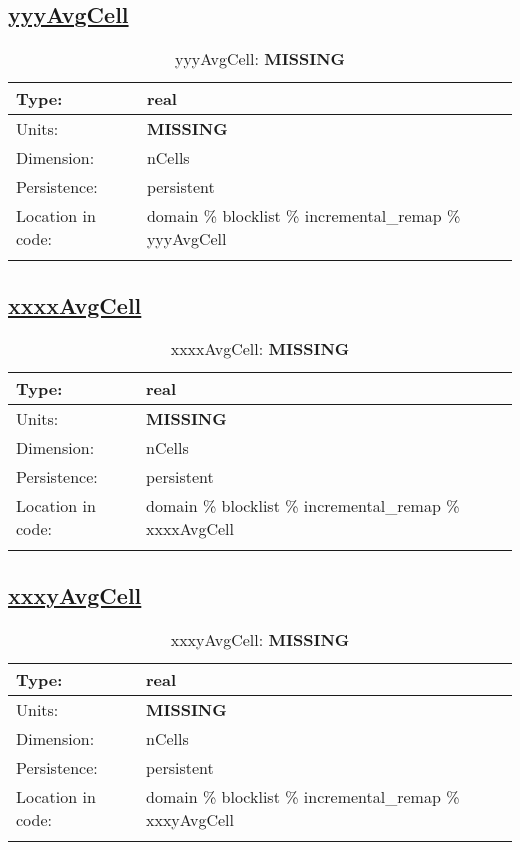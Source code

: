 \subsection[yyyAvgCell]{\hyperref[sec:var_tab_incremental_remap]{yyyAvgCell}}
\label{subsec:var_sec_incremental_remap_yyyAvgCell}
\begin{center}
\begin{longtable}{| p{2.0in} | p{4.0in} |}
        \hline 
        Type: & real \\
        \hline 
        Units: & {\bf \color{red} MISSING} \\
        \hline 
        Dimension: & nCells \\
        \hline 
        Persistence: & persistent \\
        \hline 
         Location in code: & domain \% blocklist \% incremental\_remap \% yyyAvgCell \\
         \hline 
    \caption{yyyAvgCell: {\bf \color{red} MISSING}}
\end{longtable}
\end{center}
\subsection[xxxxAvgCell]{\hyperref[sec:var_tab_incremental_remap]{xxxxAvgCell}}
\label{subsec:var_sec_incremental_remap_xxxxAvgCell}
\begin{center}
\begin{longtable}{| p{2.0in} | p{4.0in} |}
        \hline 
        Type: & real \\
        \hline 
        Units: & {\bf \color{red} MISSING} \\
        \hline 
        Dimension: & nCells \\
        \hline 
        Persistence: & persistent \\
        \hline 
         Location in code: & domain \% blocklist \% incremental\_remap \% xxxxAvgCell \\
         \hline 
    \caption{xxxxAvgCell: {\bf \color{red} MISSING}}
\end{longtable}
\end{center}
\subsection[xxxyAvgCell]{\hyperref[sec:var_tab_incremental_remap]{xxxyAvgCell}}
\label{subsec:var_sec_incremental_remap_xxxyAvgCell}
\begin{center}
\begin{longtable}{| p{2.0in} | p{4.0in} |}
        \hline 
        Type: & real \\
        \hline 
        Units: & {\bf \color{red} MISSING} \\
        \hline 
        Dimension: & nCells \\
        \hline 
        Persistence: & persistent \\
        \hline 
         Location in code: & domain \% blocklist \% incremental\_remap \% xxxyAvgCell \\
         \hline 
    \caption{xxxyAvgCell: {\bf \color{red} MISSING}}
\end{longtable}
\end{center}
